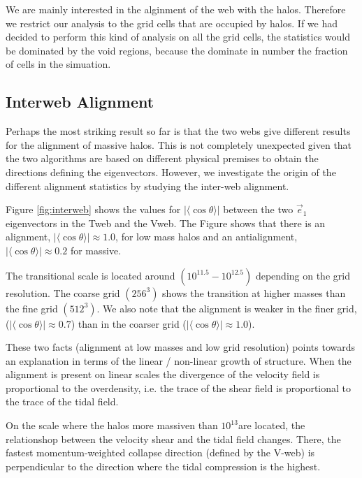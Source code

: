 \documentclass[useAMS,usenatbib]{mn2e}
\newcommand{\hMsun}{{\ifmmode{h^{-1}{\rm
        {M_{\odot}}}}\else{$h^{-1}{\rm{M_{\odot}}}$~}\fi}}
\newcommand{\muavg}{\vert\langle\cos\theta\rangle\vert}
\begin{document}
We are mainly interested in the alginment of the web with
the halos. Therefore we restrict our analysis to the grid cells that are
occupied by halos. If we had decided to perform this kind of analysis
on all the grid cells, the statistics would be dominated by the void
regions, because the dominate in number the fraction of cells in the
simuation.

\subsection{Interweb Alignment}

Perhaps the most striking result so far is that the two webs give
different results for the alignment of massive halos. This is not
completely unexpected given that the two algorithms are based on
different physical premises to obtain the directions defining the
eigenvectors. However, we investigate the origin of the different
alignment statistics by studying the inter-web alignment. 
 

Figure \ref{fig:interweb} shows the values for $\muavg$ between the
two $\vec{e}_1$ eigenvectors in the Tweb and the Vweb.  The Figure
shows that there is an alignment, $\muavg\approx 1.0$, for low mass
halos and an antialignment, $\muavg\approx 0.2$ for massive. 

The transitional scale is located around $(10^{11.5}-10^{12.5})$\hMsun
depending on the grid resolution. The coarse grid $(256^3)$ shows the
transition at higher masses than the fine grid $(512^3)$.   We also
note that the alignment is weaker in the finer grid, ($\muavg\approx
0.7$) than in the coarser grid ($\muavg\approx1.0$). 

These two facts (alignment at low masses and low grid resolution)
points towards an explanation in terms of the  linear / non-linear
growth of structure. When the alignment is present on linear scales
the divergence of the velocity field is proportional to the
overdensity, i.e. the trace of the shear field is proportional to the
trace of the tidal field. 

On the scale where the halos more massiven than $10^{13}$\hMsun are
located, the relationshop between the velocity shear and the tidal
field changes. There, the fastest momentum-weighted collapse direction
(defined by the V-web) is perpendicular to the direction where the
tidal compression is the highest.  
\end{document}
